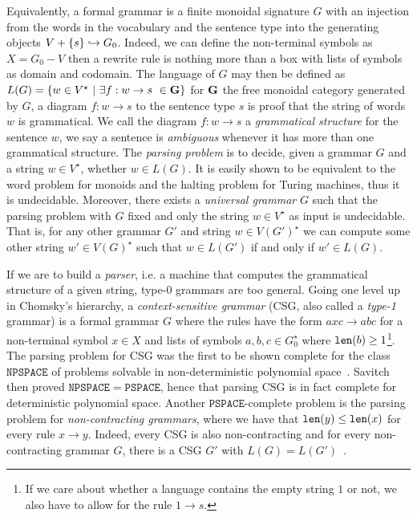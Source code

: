 Equivalently, a formal grammar is a finite monoidal signature $G$ with an injection from the words in the vocabulary and the sentence type into the generating objects $V + \{ s \} \hookrightarrow G_0$.
Indeed, we can define the non-terminal symbols as $X = G_0 - V$ then a rewrite rule is nothing more than a box with lists of symbols as domain and codomain.
The language of $G$ may then be defined as $L(G) = \{ w \in V^\star \ \vert \ \exists f : w \to s \ \in \mathbf{G} \}$ for $\mathbf{G}$ the free monoidal category generated by $G$, a diagram $f : w \to s$ to the sentence type $s$ is proof that the string of words $w$ is grammatical.
We call the diagram $f : w \to s$ a \emph{grammatical structure} for the sentence $w$, we say a sentence is \emph{ambiguous} whenever it has more than one grammatical structure.
The \emph{parsing problem} is to decide, given a grammar $G$ and a string $w \in V^\star$, whether $w \in L(G)$.
It is easily shown to be equivalent to the word problem for monoids and the halting problem for Turing machines, thus it is undecidable.
Moreover, there exists a \emph{universal grammar} $G$ such that the parsing problem with $G$ fixed and only the string $w \in V^\star$ as input is undecidable.
That is, for any other grammar $G'$ and string $w \in V(G')^\star$ we can compute some other string $w' \in V(G)^\star$ such that $w \in L(G')$ if and only if $w' \in L(G)$.

If we are to build a \emph{parser}, i.e. a machine that computes the grammatical structure of a given string, type-0 grammars are too general.
Going one level up in Chomsky's hierarchy, a \emph{context-sensitive grammar} (CSG, also called a \emph{type-1} grammar) is a formal grammar $G$ where the rules have the form $a x c \to a b c$ for a non-terminal symbol $x \in X$ and lists of symbols $a, b, c \in G_0^\star$ where $\mathtt{len}(b) \geq 1$\footnote
{If we care about whether a language contains the empty string $1$ or not, we also have to allow for the rule $1 \to s$.}.
The parsing problem for CSG was the first to be shown complete for the class $\mathtt{NPSPACE}$ of problems solvable in non-deterministic polynomial space~\cite{Kuroda64}.
Savitch~\cite{Savitch70} then proved $\mathtt{NPSPACE} = \mathtt{PSPACE}$, hence that parsing CSG is in fact complete for deterministic polynomial space.
Another $\mathtt{PSPACE}$-complete problem is the parsing problem for \emph{non-contracting grammars}, where we have that $\mathtt{len}(y) \leq \mathtt{len}(x)$ for every rule $x \to y$.
Indeed, every CSG is also non-contracting and for every non-contracting grammar $G$, there is a CSG $G'$ with $L(G) = L(G')$~\cite[Theorem~11]{Chomsky63}.


